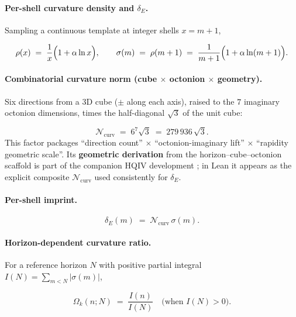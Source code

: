 \documentclass[11pt,a4paper]{article}
\theoremstyle{remark}
\begin{document}
\paragraph{Per-shell curvature density and $\delta_E$.}
Sampling a continuous template at integer shells $x=m+1$,

\begin{equation}
  \rho(x) \;=\; \frac{1}{x}\Bigl(1+\alpha\ln x\Bigr),
  \qquad
  \sigma(m) \;=\; \rho(m+1) \;=\; \frac{1}{m+1}\Bigl(1+\alpha\ln(m+1)\Bigr).
\end{equation}

\paragraph{Combinatorial curvature norm (cube $\times$ octonion $\times$ geometry).}
Six directions from a $3$D cube ($\pm$ along each axis), raised to the $7$ imaginary octonion dimensions, times the half-diagonal $\sqrt{3}$ of the unit cube:

\begin{equation}
  \mathcal{N}_{\mathrm{curv}} \;=\; 6^{7}\sqrt{3} \;=\; 279\,936\,\sqrt{3}.
\end{equation}
This factor packages ``direction count'' $\times$ ``octonion-imaginary lift'' $\times$ ``rapidity geometric scale''. Its \textbf{geometric derivation} from the horizon--cube--octonion scaffold is part of the companion HQIV development \cite{ettinger2026hqiv}; in Lean it appears as the explicit composite $\mathcal{N}_{\mathrm{curv}}$ used consistently for $\delta_E$.

\paragraph{Per-shell imprint.}
\begin{equation}
  \delta_E(m) \;=\; \mathcal{N}_{\mathrm{curv}}\,\sigma(m).
\end{equation}

\paragraph{Horizon-dependent curvature ratio.}
For a reference horizon $N$ with positive partial integral $I(N)=\sum_{m<N}|\sigma(m)|$,

\begin{equation}
  \Omega_k(n;N) \;=\; \frac{I(n)}{I(N)} \quad\text{(when }I(N)>0\text{)}.
\end{equation}
\end{document}
